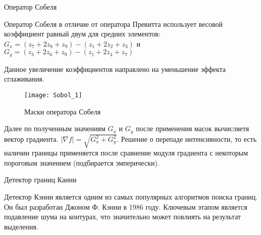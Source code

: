{\begin{center}
		Оператор Собеля
\end{center}}
Оператор Собеля в отличие от оператора Превитта использует весовой коэффициент равный двум для средних элементов:
$G_x = (z_7 + 2z_8 + z_9) - (z_1 + 2z_2 + z_3)$ и $G_y = (z_3 + 2z_6 + z_9) - (z_1 + 2z_4 + z_7)$

Данное увеличение коэффициентов направлено на уменьшение эффекта сглаживания.\cite{Phdthesis}
\begin{figure}[H]
	\centering
	\texttt{[image: Sobol\_1]}
	\caption{Маски оператора Собеля}
	\label{Sobol_1}
\end{figure}

Далее по полученным значениям $G_x$ и $G_y$ после применения масок вычисляетя вектор градиента.
$|\nabla f| = \sqrt{G_x^2 + G_y^2}$. Решение о перепаде интенсивности, то есть наличии границы применяется после сравнение модуля градиента с некоторым пороговым значением (подбирается эмперически).\cite{Phdthesis}



{\begin{center}
		Детектор границ Канни
\end{center}}
Детектор Кэнни является одним из самых популярных алгоритмов поиска границ. Он был разработан Джоном Ф. Кэнни в 1986 году. Ключевым этапом является подавление шума на контурах, что значительно может повлиять на результат выделения. \cite{Misc}
 
